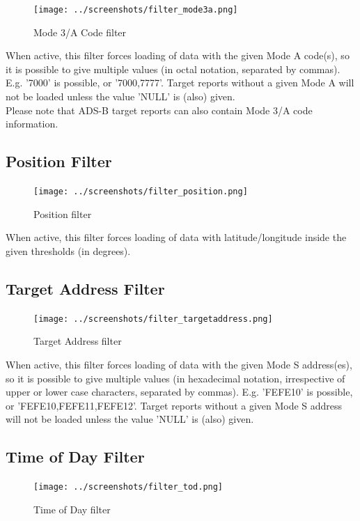 \begin{figure}[H]
  \center
    \texttt{[image: ../screenshots/filter\_mode3a.png]}
  \caption{Mode 3/A Code filter}
\end{figure}

When active, this filter forces loading of data with the given Mode A code(s), so it is possible to give multiple values (in octal notation, separated by commas). E.g. '7000' is possible, or '7000,7777'. Target reports without a given Mode A will not be loaded unless the value 'NULL' is (also) given. \\

Please note that ADS-B target reports can also contain Mode 3/A code information.

\subsection{Position Filter}

\begin{figure}[H]
  \center
    \texttt{[image: ../screenshots/filter\_position.png]}
  \caption{Position filter}
\end{figure}

When active, this filter forces loading of data with latitude/longitude inside the given thresholds (in degrees).

\subsection{Target Address Filter}

\begin{figure}[H]
  \center
    \texttt{[image: ../screenshots/filter\_targetaddress.png]}
  \caption{Target Address filter}
\end{figure}

When active, this filter forces loading of data with the given Mode S address(es), so it is possible to give multiple values (in hexadecimal notation, irrespective of upper or lower case characters, separated by commas). E.g. 'FEFE10' is possible, or 'FEFE10,FEFE11,FEFE12'. Target reports without a given Mode S address will not be loaded unless the value 'NULL' is (also) given.

\subsection{Time of Day Filter}

\begin{figure}[H]
  \center
    \texttt{[image: ../screenshots/filter\_tod.png]}
  \caption{Time of Day filter}
\end{figure}

